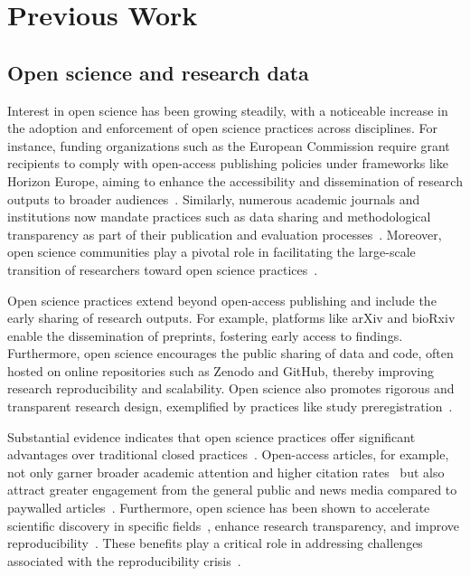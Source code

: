 \section{Previous Work}
\label{sec:headings}

\subsection{Open science and research data}
Interest in open science has been growing steadily, with a noticeable increase in the adoption and enforcement of open science practices across disciplines. For instance, funding organizations such as the European Commission require grant recipients to comply with open-access publishing policies under frameworks like Horizon Europe, aiming to enhance the accessibility and dissemination of research outputs to broader audiences~\citep{eu_openscience}. Similarly, numerous academic journals and institutions now mandate practices such as data sharing and methodological transparency as part of their publication and evaluation processes~\citep{robson2021promoting,gorgolewski2016practical}. Moreover, open science communities play a pivotal role in facilitating the large-scale transition of researchers toward open science practices~\citep{armeni2021towards}.

Open science practices extend beyond open-access publishing and include the early sharing of research outputs. For example, platforms like arXiv and bioRxiv enable the dissemination of preprints, fostering early access to findings. Furthermore, open science encourages the public sharing of data and code, often hosted on online repositories such as Zenodo and GitHub, thereby improving research reproducibility and scalability. Open science also promotes rigorous and transparent research design, exemplified by practices like study preregistration~\citep{gopal2018adherence}. 

Substantial evidence indicates that open science practices offer significant advantages over traditional closed practices~\citep{mckiernan_how_2016}. Open-access articles, for example, not only garner broader academic attention and higher citation rates~\citep{huang2024open} but also attract greater engagement from the general public and news media compared to paywalled articles~\citep{schultz2021all,yang2024open}. Furthermore, open science has been shown to accelerate scientific discovery in specific fields~\citep{woelfle2011open}, enhance research transparency, and improve reproducibility~\citep{besanccon2021open}. These benefits play a critical role in addressing challenges associated with the reproducibility crisis~\citep{open2015estimating}.

